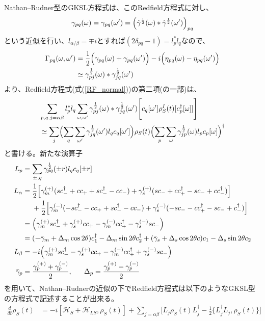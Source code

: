 \documentclass[dvipdfmx,autodetect-engine]{jsarticle}
\newcommand{\da}{\dagger}
\newcommand{\m}[1]{\mathcal{#1}}
\newcommand{\bv}[1]{\Bigl(#1\Bigr)}
\begin{document}
Nathan--Rudner型のGKSL方程式は、このRedfield方程式に対し、
\begin{align}
    \gamma_{pq}(\omega) = \gamma_{pq}(\omega') =  \qty(\hat{\gamma}^{\frac{1}{2}}(\omega)*\hat{\gamma}^{\frac{1}{2}}(\omega'))_{pq}
\end{align}
という近似を行い、$l_{\alpha/\beta} = \mp i$とすれば$(2\delta_{pq}-1) = l^*_pl_q$なので、
\begin{align}
    \Gamma_{pq}(\omega, \omega') &= \frac{1}{2}\bv{\gamma_{pq}(\omega) + \gamma_{pq}(\omega')} -i\bv{\eta_{pq}(\omega)-\eta_{pq}(\omega')}\nonumber\\
    &\simeq \gamma^{\frac{1}{2}}_{pj}(\omega)*\gamma^{\frac{1}{2}}_{jq}(\omega')
\end{align}
より、Redfield方程式(式(\ref{RF_normal}))の第二項(の一部)は、
\begin{align}
    &\sum_{p,q,j = \alpha\beta}l^*_pl_q\sum_{\omega, \omega'}\gamma^{\frac{1}{2}}_{pj}(\omega)*\gamma^{\frac{1}{2}}_{jq}(\omega')\Biggl[c_q[\omega']\rho^I_S(t)[c^\da_{p}[\omega]]\Biggr]\nonumber\\
    &\simeq \sum_{j}\bv{\sum_q \sum_{\omega'}\gamma^{\frac{1}{2}}_{jq}(\omega')l_qc_q[\omega']}\rho_S(t)\bv{\sum_p \sum_{\omega}\gamma^{\frac{1}{2}}_{jp}(\omega)l_pc_p[\omega]}^\da
\end{align}
と書ける。新たな演算子
\begin{align}
    L_{p} &= \sum_{\pm, q} \gamma^{\frac{1}{2}}_{pq}(\pm r)l_qc_q[\pm r]\\
    L_{\alpha} &= \frac{1}{2}\qty[\gamma^{(+)}_m(sc^\da_- + c c_+ + sc^\da_- - cc_-)+\gamma^{(+)}_s(sc_- + c c^\da_+- sc_- + cc_-^\da)]\nonumber\\
   & \ \ \ \ + \frac{1}{2}\qty[\gamma^{(-)}_m(-sc^\da_- - c c_+ + sc^\da_- - cc_-)+\gamma^{(-)}_s(-sc_- - c c^\da_+- sc_- + c_-^\da)]\nonumber\\
   &= \qty(\gamma^{(+)}_msc^\da_- + \gamma^{(+)}_scc_+ - \gamma^{(-)}_mcc^\da_+- \gamma^{(-)}_ssc_-)\\
   &= \qty(-\bar{\gamma}_m + \Delta_m\cos2\theta)c^\da_1 - \Delta_m\sin2\theta c^\da_2 + \qty(\bar{\gamma}_s + \Delta_s\cos2\theta c)c_1- \Delta_s\sin2\theta c_2\\
    L_{\beta} &= -i\qty(\gamma^{(+)}_msc^\da_- - \gamma^{(+)}_scc_+ - \gamma^{(-)}_mcc^\da_+ + \gamma^{(-)}_ssc_-)\\
   \bar{\gamma}_p &= \frac{\gamma^{(+)}_p + \gamma^{(-)}_p}{2}, \ \ \ \ \ \Delta_p = \frac{\gamma^{(+)}_p - \gamma^{(-)}_p}{2}
\end{align}
を用いて、Nathan--Rudnerの近似の下でRedfield方程式は以下のようなGKSL型の方程式で記述することが出来る。
\begin{align}
    \frac{d}{dt}\rho_S(t) &= -i[\m{H}_S+\m{H}_{LS}, \rho_S(t)] + \sum_{j = \alpha\beta}\Biggl[L_j\rho_S(t)L^\da_j - \frac{1}{2}\bigl\{L_j^\da L_j, \rho_S(t) \bigr\}\Biggr]
\end{align}


\end{document}
